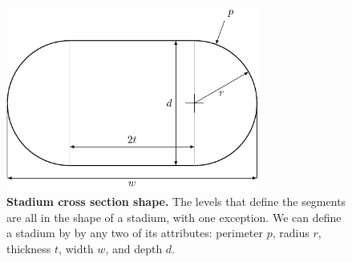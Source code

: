 \documentclass[10pt]{article}
\begin{document}
\begin{figure}[!ht]
  \begin{center}
    \includegraphics[width=3.27in]{figfactory/stadium/stadium.pdf}
  \end{center}
  \caption{
    {\bf Stadium cross section shape.}  The levels that define the segments are
    all in the shape of a stadium, with one exception. We can define a stadium
    by by any two of its attributes: perimeter $p$, radius $r$, thickness $t$,
    width $w$, and depth $d$.
  }
  \label{fig:stadium}
\end{figure}
\end{document}
